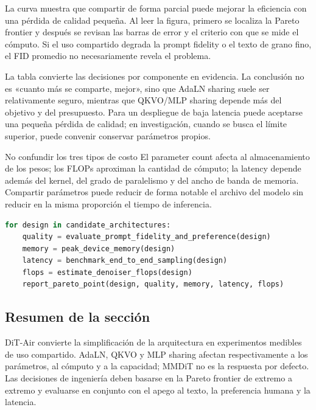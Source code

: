 
La curva muestra que compartir de forma parcial puede mejorar la eficiencia con una pérdida de calidad pequeña. Al leer la figura, primero se localiza la Pareto frontier y después se revisan las barras de error y el criterio con que se mide el cómputo. Si el uso compartido degrada la prompt fidelity o el texto de grano fino, el FID promedio no necesariamente revela el problema.


La tabla convierte las decisiones por componente en evidencia. La conclusión no es «cuanto más se comparte, mejor», sino que AdaLN sharing suele ser relativamente seguro, mientras que QKVO/MLP sharing depende más del objetivo y del presupuesto. Para un despliegue de baja latencia puede aceptarse una pequeña pérdida de calidad; en investigación, cuando se busca el límite superior, puede convenir conservar parámetros propios.


\begin{importantbox}{No confundir los tres tipos de costo}
El parameter count afecta al almacenamiento de los pesos; los FLOPs aproximan la cantidad de cómputo; la latency depende además del kernel, del grado de paralelismo y del ancho de banda de memoria. Compartir parámetros puede reducir de forma notable el archivo del modelo sin reducir en la misma proporción el tiempo de inferencia.
\end{importantbox}

\begin{lstlisting}[language=Python,caption={Comparar las opciones de uso compartido con indicadores de Pareto, no solo ordenarlas por una única puntuación de calidad}]
for design in candidate_architectures:
    quality = evaluate_prompt_fidelity_and_preference(design)
    memory = peak_device_memory(design)
    latency = benchmark_end_to_end_sampling(design)
    flops = estimate_denoiser_flops(design)
    report_pareto_point(design, quality, memory, latency, flops)
\end{lstlisting}

\subsection{Resumen de la sección}

DiT-Air convierte la simplificación de la arquitectura en experimentos medibles de uso compartido. AdaLN, QKVO y MLP sharing afectan respectivamente a los parámetros, al cómputo y a la capacidad; MMDiT no es la respuesta por defecto. Las decisiones de ingeniería deben basarse en la Pareto frontier de extremo a extremo y evaluarse en conjunto con el apego al texto, la preferencia humana y la latencia.
